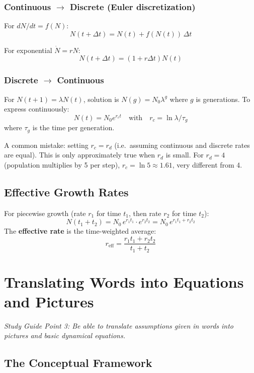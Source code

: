 \documentclass[11pt]{article}
\begin{document}
\subsubsection{Continuous $\to$ Discrete (Euler discretization)}
For $dN/dt = f(N)$:
\[
N(t+\Delta t) = N(t) + f(N(t))\,\Delta t
\]

For exponential $\dot N = rN$: 
\[                                                 
N(t+\Delta t) = (1 + r\Delta t)N(t)              
\] 

\subsubsection{Discrete $\to$ Continuous}
For $N(t+1) = \lambda N(t)$, solution is $N(g) = N_0 \lambda^g$ where $g$ is generations. To express continuously:
\[
N(t) = N_0 e^{r_c t} \quad\text{with}\quad r_c = \ln \lambda / \tau_g
\]
where $\tau_g$ is the time per generation.

\begin{warnbox}
A common mistake: setting $r_c = r_d$ (i.e.\ assuming continuous and discrete rates are equal). This is only approximately true when $r_d$ is small. For $r_d = 4$ (population multiplies by 5 per step), $r_c = \ln 5 \approx 1.61$, very different from 4.
\end{warnbox}

\subsection{Effective Growth Rates}

For piecewise growth (rate $r_1$ for time $t_1$, then rate $r_2$ for time $t_2$):
\[
N(t_1 + t_2) = N_0\, e^{r_1 t_1}\cdot e^{r_2 t_2} = N_0\, e^{r_1 t_1 + r_2 t_2}
\]
The \textbf{effective rate} is the time-weighted average:
\[
r_{\text{eff}} = \frac{r_1 t_1 + r_2 t_2}{t_1 + t_2}
\]

\section{Translating Words into Equations and Pictures}

\textit{Study Guide Point 3: Be able to translate assumptions given in words into pictures and basic dynamical equations.}

\subsection{The Conceptual Framework}
\end{document}
